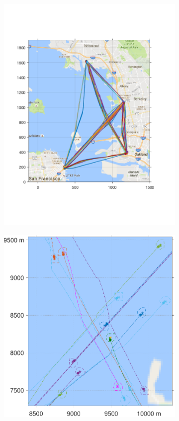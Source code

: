 \begin{figure}[H]
 \centering
\begin{subfigure}{0.5\textwidth}
  \includegraphics[width=\columnwidth]{figs/bayArea_d11sep5}
  \subcaption{}
  \label{fig:bayArea_d11sep5}
\end{subfigure}%
\begin{subfigure}{0.5\textwidth}
  \includegraphics[width=\columnwidth]{figs/bayArea_d11sep5_zoomed}

\end{subfigure}
\end{figure}
